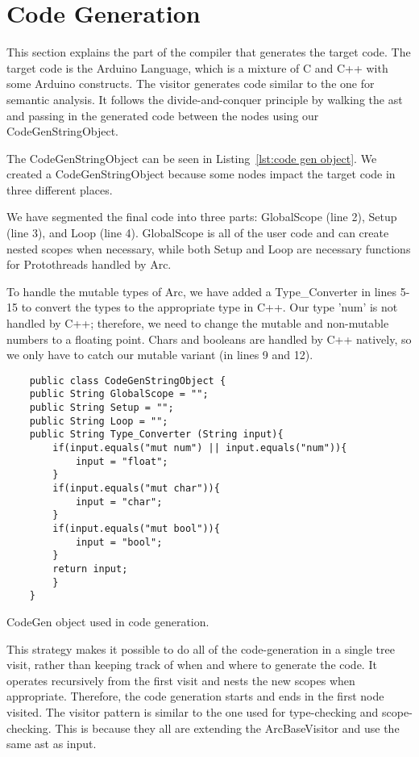 \section{Code Generation}\label{sec:codegeneration}
This section explains the part of the compiler that generates the target code. The target code is the Arduino Language, which is a mixture of C and C++ with some Arduino constructs. The visitor generates code similar to the one for semantic analysis. It follows the divide-and-conquer principle by walking the \gls{ast} and passing in the generated code between the nodes using our CodeGenStringObject.

The CodeGenStringObject can be seen in Listing~\ref{lst:code gen object}. We created a CodeGenStringObject because some nodes impact the target code in three different places.

We have segmented the final code into three parts: GlobalScope (line 2), Setup (line 3), and Loop (line 4). GlobalScope is all of the user code and can create nested scopes when necessary, while both Setup and Loop are necessary functions for Protothreads handled by Arc.

To handle the mutable types of Arc, we have added a Type\_Converter in lines 5-15 to convert the types to the appropriate type in C++. Our type 'num' is not handled by C++; therefore, we need to change the mutable and non-mutable numbers to a floating point. Chars and booleans are handled by C++ natively, so we only have to catch our mutable variant (in lines 9 and 12).


\begin{listing}[htb!]
    \begin{verbatim}
    public class CodeGenStringObject {
    public String GlobalScope = "";
    public String Setup = "";
    public String Loop = "";
    public String Type_Converter (String input){
        if(input.equals("mut num") || input.equals("num")){
            input = "float";
        }
        if(input.equals("mut char")){
            input = "char";
        }
        if(input.equals("mut bool")){
            input = "bool";
        }
        return input;
        }
    }
    \end{verbatim}
    \caption{CodeGen object used in code generation.}
    \label{lst:code gen object}
\end{listing}


This strategy makes it possible to do all of the code-generation in a single tree visit, rather than keeping track of when and where to generate the code. It operates recursively from the first visit and nests the new scopes when appropriate. Therefore, the code generation starts and ends in the first node visited. The visitor pattern is similar to the one used for type-checking and scope-checking. This is because they all are extending the ArcBaseVisitor and use the same \gls{ast} as input.

